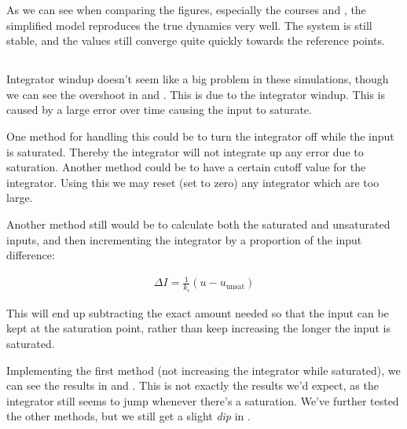 As we can see when comparing the figures, especially the courses  and , the simplified model reproduces the true dynamics very well. The system is still stable, and the values still converge quite quickly towards the reference points. 

\subsection{}
Integrator windup doesn't seem like a big problem in these simulations, though we can see the overshoot in  and . This is due to the integrator windup. This is caused by a large error over time causing the input to saturate. 

One method for handling this could be to turn the integrator off while the input is saturated. Thereby the integrator will not integrate up any error due to saturation. Another method could be to have a certain cutoff value for the integrator. Using this we may reset (set to zero) any integrator which are too large. 

Another method still would be to calculate both the saturated and unsaturated inputs, and then incrementing the integrator by a proportion of the input difference: 

\begin{align*}
	\Delta I = \frac{1}{k_i} (u - u_{\text{unsat}})
\end{align*}

This will end up subtracting the exact amount needed so that the input can be kept at the saturation point, rather than keep increasing the longer the input is saturated. 

Implementing the first method (not increasing the integrator while saturated), we can see the results in  and . This is not exactly the results we'd expect, as the integrator still seems to jump whenever there's a saturation. We've further tested the other methods, but we still get a slight \textit{dip} in .

